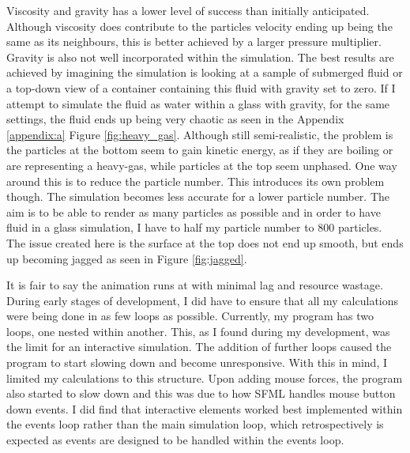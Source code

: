 \documentclass[write-up.tex]{subfiles}
\begin{document}
Viscosity and gravity has a lower level of success than initially anticipated. Although viscosity does contribute to the particles velocity ending up being the same as its neighbours, this is better achieved by a larger pressure multiplier. Gravity is also not well incorporated within the simulation. The best results are achieved by imagining the simulation is looking at a sample of submerged fluid or a top-down view of a container containing this fluid with gravity set to zero. If I attempt to simulate the fluid as water within a glass with gravity, for the same settings, the fluid ends up being very chaotic as seen in the Appendix \ref{appendix:a} Figure \ref{fig:heavy_gas}. Although still semi-realistic, the problem is the particles at the bottom seem to gain kinetic energy, as if they are boiling or are representing a heavy-gas, while particles at the top seem unphased. One way around this is to reduce the particle number. This introduces its own problem though. The simulation becomes less accurate for a lower particle number. The aim is to be able to render as many particles as possible and in order to have fluid in a glass simulation, I have to half my particle number to 800 particles. The issue created here is the surface at the top does not end up smooth, but ends up becoming jagged as seen in Figure \ref{fig:jagged}.

It is fair to say the animation runs at with minimal lag and resource wastage. During early stages of development, I did have to ensure that all my calculations were being done in as few loops as possible. Currently, my program has two loops, one nested within another. This, as I found during my development, was the limit for an interactive simulation. The addition of further loops caused the program to start slowing down and become unresponsive. With this in mind, I limited my calculations to this structure. Upon adding mouse forces, the program also started to slow down and this was due to how SFML handles mouse button down events. I did find that interactive elements worked best implemented within the events loop rather than the main simulation loop, which retrospectively is expected as events are designed to be handled within the events loop.
\end{document}
